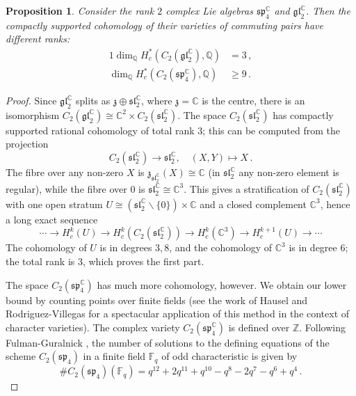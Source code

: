 \documentclass[oneside, 12pt, a4paper]{amsart}
\numberwithin{equation}{section}
\newcommand{\F}{\mathbb{F}}
\newcommand{\C}{\mathbb{C}}
\newcommand{\Q}{\mathbb{Q}}
\theoremstyle{plain}
\newtheorem{proposition}[theorem]{Proposition}
\theoremstyle{definition}
\theoremstyle{remark}
\begin{document}
\begin{proposition} \label{prop:complexreductiveliealgebra}
Consider the rank $2$ complex Lie algebras $\mathfrak{sp}_4^\mathbb{C}$ and $\mathfrak{gl}_2^\mathbb{C}$. Then the compactly supported cohomology of their varieties of commuting pairs have different ranks:
\begin{alignat*}{1}
\dim_\mathbb{Q}H^*_c(C_2(\mathfrak{gl}_2^\mathbb{C}),\Q) & =3\,, \\
\dim_\mathbb{Q}H^*_c(C_2(\mathfrak{sp}_4^\mathbb{C}),\Q) & \geq 9\, .
\end{alignat*}
\end{proposition}

\begin{proof}
Since $\mathfrak{gl}^\C_2$ splits as $\mathfrak{z}\oplus \mathfrak{sl}_2^\C$, where $\mathfrak{z}=\C$ is the centre, there is an isomorphism $C_2(\mathfrak{gl}_2^\C) \cong \C^2\times C_2(\mathfrak{sl}_2^\C)$. The space $C_2(\mathfrak{sl}_2^\C)$ has compactly supported rational cohomology of total rank $3$; this can be computed from the projection \[C_2(\mathfrak{sl}^\C_2)\to \mathfrak{sl}^\C_2,\quad (X,Y)\mapsto X\, .\]
The fibre over any non-zero $X$ is $\mathfrak{z}_{\mathfrak{sl}_2^\C}(X)\cong \C$ (in $\mathfrak{sl}_2^\C$ any non-zero element is regular), while the fibre over $0$ is $\mathfrak{sl}_2^\C\cong \C^3$. This gives a stratification of $C_2(\mathfrak{sl}_2^\C)$ with one open stratum $U\cong (\mathfrak{sl}_2^\C\backslash \{0\})\times \C$ and a closed complement $\C^3$, hence a long exact sequence
\[
\cdots \to H_c^k(U) \to H_c^k(C_2(\mathfrak{sl}_2^\C)) \to H^k_c(\C^3)\to H^{k+1}_c(U) \to \cdots
\]
The cohomology of $U$ is in degrees $3,8$, and the cohomology of $\C^3$ is in degree $6$; the total rank is $3$, which proves the first part.

The space $C_2(\mathfrak{sp}^\C_4)$ has much more cohomology, however. We obtain our lower bound by counting points over finite fields (see the work of Hausel and Rodriguez-Villegas \cite{HauselRodriguez} for a spectacular application of this method in the context of character varieties). The complex variety $C_2(\mathfrak{sp}_4^\mathbb{C})$ is defined over $\mathbb{Z}$. Following Fulman-Guralnick \cite[Theorem 4.6]{FulmanGuralnick}, the number of solutions to the defining equations of the scheme $C_2(\mathfrak{sp}_4)$ in a finite field $\F_q$ of odd characteristic is given by
\[\#C_2(\mathfrak{sp}_4)(\mathbb{F}_q)=q^{12}+2q^{11}+q^{10}-q^8-2q^7-q^6+q^4\,.\]


\end{proof}
\end{document}
